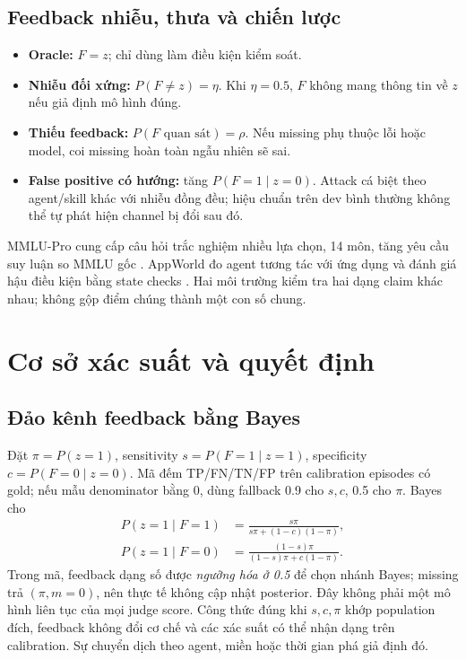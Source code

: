 \documentclass[11pt,a4paper,openany]{book}
\newcommand{\repo}[1]{\path{#1}}
\begin{document}
\section{Feedback nhiễu, thưa và chiến lược}
\begin{itemize}
\item \textbf{Oracle:} \(F=z\); chỉ dùng làm điều kiện kiểm soát.
\item \textbf{Nhiễu đối xứng:} \(P(F\ne z)=\eta\). Khi \(\eta=0.5\), \(F\) không mang thông tin về \(z\) nếu giả định mô hình đúng.
\item \textbf{Thiếu feedback:} \(P(F\text{ quan sát})=\rho\). Nếu missing phụ thuộc lỗi hoặc model, coi missing hoàn toàn ngẫu nhiên sẽ sai.
\item \textbf{False positive có hướng:} tăng \(P(F=1\mid z=0)\). Attack cá biệt theo agent/skill khác với nhiễu đồng đều; hiệu chuẩn trên dev bình thường không thể tự phát hiện channel bị đổi sau đó.
\end{itemize}
MMLU-Pro cung cấp câu hỏi trắc nghiệm nhiều lựa chọn, 14 môn, tăng yêu cầu suy luận so MMLU gốc \cite{mmlupro}. AppWorld đo agent tương tác với ứng dụng và đánh giá hậu điều kiện bằng state checks \cite{appworld}. Hai môi trường kiểm tra hai dạng claim khác nhau; không gộp điểm chúng thành một con số chung.

\chapter{Cơ sở xác suất và quyết định}
\section{Đảo kênh feedback bằng Bayes}
Đặt \(\pi=P(z=1)\), sensitivity \(s=P(F=1\mid z=1)\), specificity \(c=P(F=0\mid z=0)\). Mã \repo{ecrt.py} đếm TP/FN/TN/FP trên calibration episodes có gold; nếu mẫu denominator bằng 0, dùng fallback 0.9 cho \(s,c\), 0.5 cho \(\pi\). Bayes cho
\begin{align}
P(z=1\mid F=1)&=\frac{s\pi}{s\pi+(1-c)(1-\pi)},\label{eq:bayespos}\\
P(z=1\mid F=0)&=\frac{(1-s)\pi}{(1-s)\pi+c(1-\pi)}.\label{eq:bayesneg}
\end{align}
Trong mã, feedback dạng số được \emph{ngưỡng hóa ở 0.5} để chọn nhánh Bayes; missing trả \((\pi,m=0)\), nên thực tế không cập nhật posterior. Đây không phải một mô hình liên tục của mọi judge score. Công thức đúng khi \(s,c,\pi\) khớp population đích, feedback không đổi cơ chế và các xác suất có thể nhận dạng trên calibration. Sự chuyển dịch theo agent, miền hoặc thời gian phá giả định đó.
\end{document}
